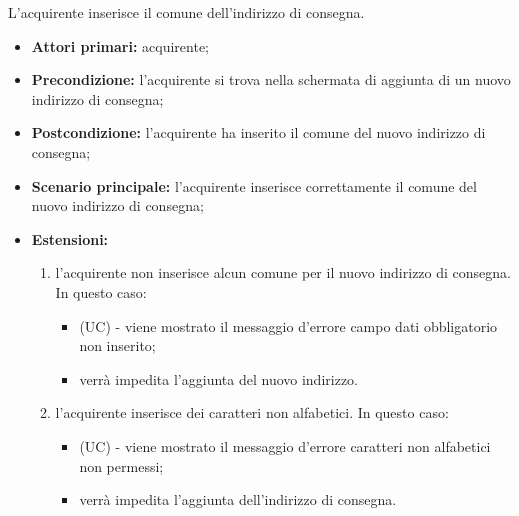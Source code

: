 L'acquirente inserisce il comune dell'indirizzo di consegna.
\begin{itemize}
    \item \textbf{Attori primari:} acquirente;
    \item \textbf{Precondizione:} l'acquirente si trova nella schermata di aggiunta di un nuovo indirizzo di consegna;
    \item \textbf{Postcondizione:} l'acquirente ha inserito il comune del nuovo indirizzo di consegna;
    \item \textbf{Scenario principale:} l'acquirente inserisce correttamente il comune del nuovo indirizzo di consegna;
    \item \textbf{Estensioni:}
    \begin{enumerate}[label=\lett]
        \item l'acquirente non inserisce alcun comune per il nuovo indirizzo di consegna. In questo caso:
        \begin{itemize}
            \item (UC) - viene mostrato il messaggio d'errore campo dati obbligatorio non inserito;
            \item verrà impedita l'aggiunta del nuovo indirizzo.
        \end{itemize}
        \item l'acquirente inserisce dei caratteri non alfabetici. In questo caso:
        \begin{itemize}
            \item (UC) - viene mostrato il messaggio d'errore caratteri non alfabetici non permessi;
            \item verrà impedita l'aggiunta dell'indirizzo di consegna.
        \end{itemize}
    \end{enumerate}
\end{itemize}

